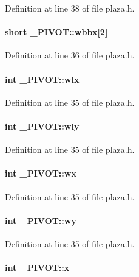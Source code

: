 Definition at line 38 of file plaza.h.\label{_PIVOT_m8}
\paragraph{\setlength{\rightskip}{0pt plus 5cm}short \_\-PIVOT::wbbx[2]}\hfill



Definition at line 36 of file plaza.h.\label{_PIVOT_m6}
\paragraph{\setlength{\rightskip}{0pt plus 5cm}int \_\-PIVOT::wlx}\hfill



Definition at line 35 of file plaza.h.\label{_PIVOT_m7}
\paragraph{\setlength{\rightskip}{0pt plus 5cm}int \_\-PIVOT::wly}\hfill



Definition at line 35 of file plaza.h.\label{_PIVOT_m4}
\paragraph{\setlength{\rightskip}{0pt plus 5cm}int \_\-PIVOT::wx}\hfill



Definition at line 35 of file plaza.h.\label{_PIVOT_m5}
\paragraph{\setlength{\rightskip}{0pt plus 5cm}int \_\-PIVOT::wy}\hfill



Definition at line 35 of file plaza.h.\label{_PIVOT_m0}
\paragraph{\setlength{\rightskip}{0pt plus 5cm}int \_\-PIVOT::x}\hfill



